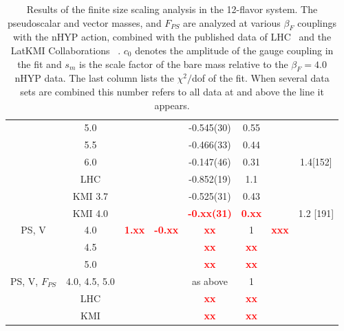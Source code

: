 \documentclass[prl, letterpaper, amsmath, amssymb, preprintnumbers, showpacs, superscriptaddress, twocolumn]{revtex4-1}
\newcommand{\be}{\ensuremath{\beta} }
\newcommand{\TODO}[1]{\textcolor{red}{{\bf #1}}}
\begin{document}
\begin{table}[htdp]
\begin{center}
\begin{tabular}{|c|c|c|c|c|c|c|c|}
                      & 5.0           &             &               & -0.545(30)                & 0.55        &                 &                         \\
                      & 5.5           &             &               & -0.466(33)                & 0.44        &                 &                         \\
                      & 6.0           &             &               & -0.147(46)                & 0.31        &                 & 1.4[152]                \\
                      & LHC           &             &               & -0.852(19)                & 1.1         &                 &                         \\
                      & KMI 3.7       &             &               & -0.525(31)                & 0.43        &                 &                         \\
                      & KMI 4.0       &             &               & \TODO{-0.xx(31)}          & \TODO{0.xx} &                 & 1.2 [191]               \\
      \hline
      PS, V           & 4.0           & \TODO{1.xx} & \TODO{-0.xx}  & \TODO{xx}                 & 1           & \TODO{xxx}      &                         \\
                      & 4.5           &             &               & \TODO{xx}                 & \TODO{xx}   &                 &                         \\
                      & 5.0           &             &               & \TODO{xx}                 & \TODO{xx}   &                 &                         \\
      \hline
      PS, V, $F_{PS}$ & 4.0, 4.5, 5.0 &             &               & as above                  & 1           &                 &                         \\
                      & LHC           &             &               & \TODO{xx}                 & \TODO{xx}   &                 &                         \\
                      & KMI           &             &               & \TODO{xx}                 & \TODO{xx}   &                 &                         \\
      \hline
      \hline
    \end{tabular}
  \end{center}
  \caption{Results of the finite size scaling analysis in the 12-flavor system.  The pseudoscalar and  vector masses, and $F_{PS}$ are analyzed at various $\beta_F$ couplings with the nHYP action, combined with the published data of LHC~\protect\cite{Fodor:2011tu} and the LatKMI Collaborations ~\protect\cite{Fodor:2011tu,Aoki:2012eq}.  $c_0$ denotes the amplitude of the gauge coupling in the fit and $s_m$ is the scale factor of the bare mass relative to the $\be_F = 4.0$ nHYP data.  The last column lists the $\chi^2/$dof of the fit.  When several data sets are combined this number refers to all data at and above the line it appears.}
  \label{table:results}
\end{table}
\end{document}
